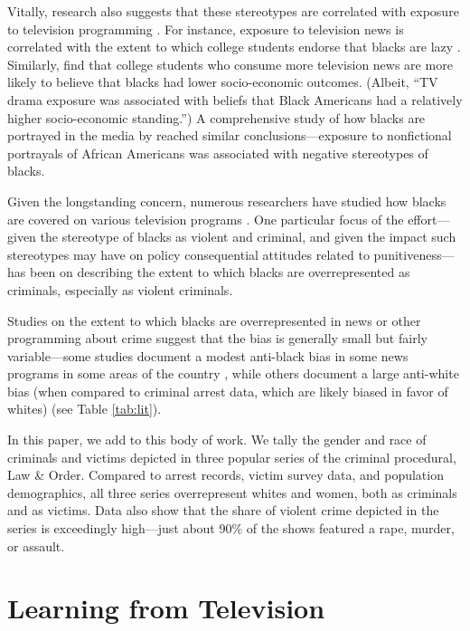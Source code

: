 \documentclass[12pt, letterpaper]{article}
\begin{document}
Vitally, research also suggests that these stereotypes are correlated with exposure to television programming \citep{busselle2002television, entman2001black, armstrong1992tv}. For instance, exposure to television news is correlated with the extent to which college students endorse that blacks are lazy \citep{busselle2002television}. Similarly, \citet{armstrong1992tv} find that college students who consume more television news are more likely to believe that blacks had lower socio-economic outcomes. (Albeit, ``TV drama exposure was associated with beliefs that Black Americans had a relatively higher socio-economic standing.'') A comprehensive study of how blacks are portrayed in the media by \citet{entman2001black} reached similar conclusions---exposure to nonfictional portrayals of African Americans was associated with negative stereotypes of blacks.

Given the longstanding concern, numerous researchers have studied how blacks are covered on various television programs \citep[for e.g.,][]{entman2001black, eschholz2004images}. One particular focus of the effort---given the stereotype of blacks as violent and criminal, and given the impact such stereotypes may have on policy consequential attitudes related to punitiveness---has been on describing the extent to which blacks are overrepresented as criminals, especially as violent criminals. 

Studies on the extent to which blacks are overrepresented in news or other programming about crime suggest that the bias is generally small but fairly variable---some studies document a modest anti-black bias in some news programs in some areas of the country \citep{gilliam1996crime}, while others document a large anti-white bias (when compared to criminal arrest data, which are likely biased in favor of whites) \citep{chiricos2002racial, dixon2000overrepresentation, eschholz2004images} (see Table \ref{tab:lit}). 



In this paper, we add to this body of work. We tally the gender and race of criminals and victims depicted in three popular series of the criminal procedural, Law \& Order. Compared to arrest records, victim survey data, and population demographics, all three series overrepresent whites and women, both as criminals and as victims. Data also show that the share of violent crime depicted in the series is exceedingly high---just about 90\% of the shows featured a rape, murder, or assault.

\section*{Learning from Television}
\end{document}
